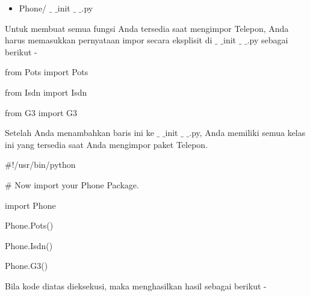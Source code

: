 \documentclass[a4paper,12pt]{report}
\begin{document}
 \par
\noindent 
\begin{itemize}
\item {\fontsize{10pt}{10pt}\selectfont Phone/ $  \_  $ $  \_  $init $  \_  $ $  \_  $.py}\end{itemize}
 \par
\begin{adjustwidth}{0.03in}{0.03in}
Untuk membuat semua fungsi Anda tersedia saat mengimpor Telepon, Anda harus memasukkan pernyataan impor secara eksplisit di  $  \_  $ $  \_  $init $  \_  $ $  \_  $.py sebagai berikut -\end{adjustwidth}
 \par
\noindent 
 \hspace*{0.5in} from Pots import Pots \par
\noindent 
 \hspace*{0.5in} from Isdn import Isdn \par
\noindent 
 \hspace*{0.5in} from G3 import G3 \par
\vspace{12pt}
\begin{adjustwidth}{0.03in}{0.03in}
Setelah Anda menambahkan baris ini ke  $  \_  $ $  \_  $init $  \_  $ $  \_  $.py, Anda memiliki semua kelas ini yang tersedia saat Anda mengimpor paket Telepon.\end{adjustwidth}
 \par
\noindent 
 \hspace*{0.5in}  $  \#  $!/usr/bin/python \par
\vspace{12pt}
\noindent 
 \hspace*{0.5in}  $  \#  $ Now import your Phone Package. \par
\noindent 
 \hspace*{0.5in} import Phone \par
\vspace{12pt}
\noindent 
 \hspace*{0.5in} Phone.Pots() \par
\noindent 
 \hspace*{0.5in} Phone.Isdn() \par
\noindent 
 \hspace*{0.5in} Phone.G3() \par
\begin{adjustwidth}{0.03in}{0.03in}
Bila kode diatas dieksekusi, maka menghasilkan hasil sebagai berikut -\end{adjustwidth}
\end{document}
